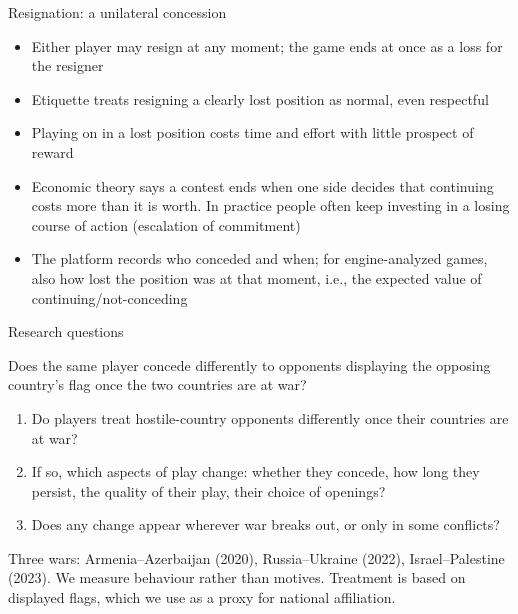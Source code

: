 \documentclass[aspectratio=169,11pt,t]{beamer}
\begin{document}
\begin{frame}{Resignation: a unilateral concession}
  \begin{itemize}
    \item Either player may resign at any moment; the game ends at once as a loss for the resigner
    \item Etiquette treats resigning a clearly lost position as normal, even respectful
    \item Playing on in a lost position costs time and effort with little prospect of reward
    \item Economic theory says a contest ends when one side decides that continuing costs more than it is worth. In practice people often keep investing in a losing course of action (escalation of commitment)
    \item The platform records who conceded and when; for engine-analyzed games, also how lost the position was at that moment, i.e., the expected value of continuing/not-conceding
  \end{itemize}
\end{frame}

\begin{frame}{Research questions}
  \begin{block}{}
    Does the same player concede differently to opponents displaying the opposing country's flag once the two countries are at war?
  \end{block}
  \vspace{2mm}
  \begin{enumerate}
    \item Do players treat hostile-country opponents differently once their countries are at war?
    \item If so, which aspects of play change: whether they concede, how long they persist, the quality of their play, their choice of openings?
    \item Does any change appear wherever war breaks out, or only in some conflicts?
  \end{enumerate}
  \vspace{2mm}
  Three wars: Armenia--Azerbaijan (2020), Russia--Ukraine (2022), Israel--Palestine (2023). We measure behaviour rather than motives. Treatment is based on displayed flags, which we use as a proxy for national affiliation.
\end{frame}
\end{document}
